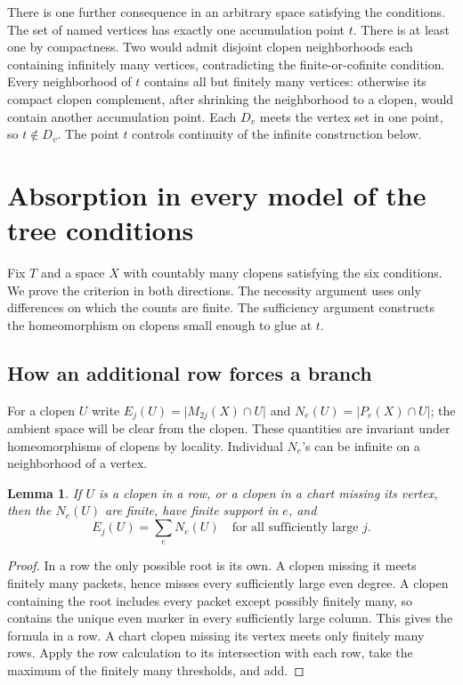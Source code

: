 \documentclass[11pt,letterpaper]{article}
\newtheorem{lemma}[theorem]{Lemma}
\theoremstyle{definition}\newtheorem{definition}[theorem]{Definition}
\newcommand{\card}[1]{\lvert #1\rvert}
\begin{document}
There is one further consequence in an arbitrary space satisfying the
conditions. The set of named vertices has exactly one accumulation point
\(t\). There is at least one by compactness. Two would admit disjoint
clopen neighborhoods each containing infinitely many vertices, contradicting
the finite-or-cofinite condition. Every neighborhood of \(t\) contains
all but finitely many vertices: otherwise its compact clopen complement,
after shrinking the neighborhood to a clopen, would contain another
accumulation point. Each \(D_v\) meets the vertex set in one point, so
\(t\notin D_v\). The point \(t\) controls continuity of the infinite
construction below.
\section{Absorption in every model of the tree conditions}\label{sec:absorb}
Fix \(T\) and a space \(X\) with countably many clopens satisfying the six
conditions. We prove the criterion in both directions. The necessity
argument uses only differences on which the counts are finite. The
sufficiency argument constructs the homeomorphism on clopens small enough
to glue at \(t\).

\subsection{How an additional row forces a branch}
For a clopen \(U\) write \(E_j(U)=\card{M_{2j}(X)\cap U}\) and
\(N_e(U)=\card{P_e(X)\cap U}\); the ambient space will be clear from the
clopen. These quantities are invariant under homeomorphisms of clopens by
locality. Individual \(N_e\)'s can be infinite on a neighborhood of a
vertex.
\begin{lemma}\label{lem:balance}
If \(U\) is a clopen in a row, or a clopen in a chart missing its vertex,
then the \(N_e(U)\) are finite, have finite support in \(e\), and
\[
                  E_j(U)=\sum_e N_e(U)\quad\text{for all sufficiently large } j.
\]
\end{lemma}
\begin{proof}
In a row the only possible root is its own. A clopen missing it meets
finitely many packets, hence misses every sufficiently large even degree.
A clopen containing the root includes every packet except possibly
finitely many, so contains the unique even marker in every sufficiently
large column. This gives the formula in a row. A chart clopen missing its
vertex meets only finitely many rows. Apply the row calculation to its
intersection with each row, take the maximum of the finitely many
thresholds, and add.
\end{proof}
\end{document}

